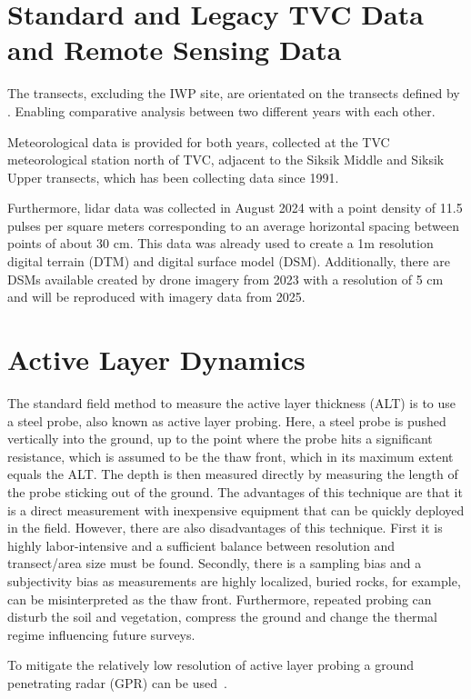 \section{Standard and Legacy TVC Data and Remote Sensing Data}
The transects, excluding the IWP site, are orientated on the transects defined by \citet{dakinHowDryYear2023}. 
Enabling comparative analysis between two different years with each other. 

Meteorological data is provided for both years, collected at the TVC meteorological station north of TVC, adjacent to the Siksik Middle and Siksik Upper transects, which has been collecting data since 1991. 

Furthermore, lidar data was collected in August 2024 with a point density of 11.5 pulses per square meters corresponding to an average horizontal spacing between points of about 30 cm. 
This data was already used to create a 1m resolution digital terrain (DTM) and digital surface model (DSM). 
Additionally, there are DSMs available created by drone imagery from 2023 with a resolution of 5 cm and will be reproduced with imagery data from 2025.

\section{Active Layer Dynamics}
The standard field method to measure the active layer thickness (ALT) is to use a steel probe, also known as active layer probing. 
Here, a steel probe is pushed vertically into the ground, up to the point where the probe hits a significant resistance, which is assumed to be the thaw front, which in its maximum extent equals the ALT. 
The depth is then measured directly by measuring the length of the probe sticking out of the ground. 
The advantages of this technique are that it is a direct measurement with inexpensive equipment that can be quickly deployed in the field. 
However, there are also disadvantages of this technique. First it is highly labor-intensive and a sufficient balance between resolution and transect/area size must be found. 
Secondly, there is a sampling bias and a subjectivity bias as measurements are highly localized, buried rocks, for example, can be misinterpreted as the thaw front. 
Furthermore, repeated probing can disturb the soil and vegetation, compress the ground and change the thermal regime influencing future surveys.

To mitigate the relatively low resolution of active layer probing a ground penetrating radar (GPR) can be used~\citep{angelopoulosApplicationCCRGPR2013,guoDetectionPermafrostSubgrade2015,harrisUsingGroundPenetratingRadar2025,hinkelDetectionSubsurfacePermafrost2001,koyanPotential3DGPR2025,moormanImagingNearsurfacePermafrost2007,sudakovaUsingGroundPenetrating2021,sudakovaGroundPenetratingRadarStudies2019}.
